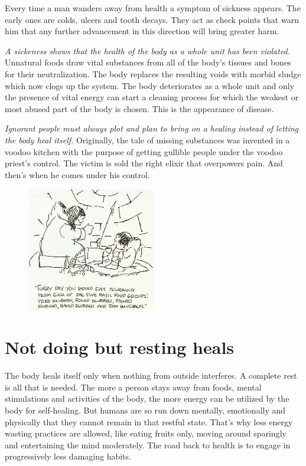 \documentclass[12pt,letterpaper]{article}
\begin{document}
Every time a man wanders away from health a symptom of sickness
appears. The early ones are colds, ulcers and tooth decays. They act
as check points that warn him that any further advancement in this
direction will bring greater harm.

\emph{A sickeness shows that the health of the body as a whole unit has
been violated.} Unnatural foods draw vital substances from all of the
body's tissues and bones for their neutralization. The body replaces the
resulting voids with morbid sludge which now clogs up the system. The
body deteriorates as a whole unit and only the presence of vital
energy can start a cleaning process for which the weakest or most
abused part of the body is chosen. This is the appearance of disease.

\emph{Ignorant people must always plot and plan to bring on a healing
instead of letting the body heal itself.} Originally, the tale of
missing substances was invented in a voodoo kitchen with the purpose
of getting gullible people under the voodoo priest's control. The
victim is sold the right elixir that overpowers pain. And then's when
he comes under his control.

\begin{figure}
  \includegraphics[width=0.5\textwidth]{p27.jpg}
\end{figure}


\section{Not doing but resting heals}
\label{sec:ndbrh}

The body heals itself only when nothing from outside interferes. A
complete rest is all that is needed. The more a person stays away from
foods, mental stimulations and activities of the body, the more energy
can be utilized by the body for self-healing. But humans are so run
down mentally, emotionally and physically that they cannot remain in
that restful state. That's why less energy wasting practices are
allowed, like eating fruits only, moving around sparingly and
entertaining the mind moderately. The road back to health is to engage
in progressively less damaging habits.
\end{document}
